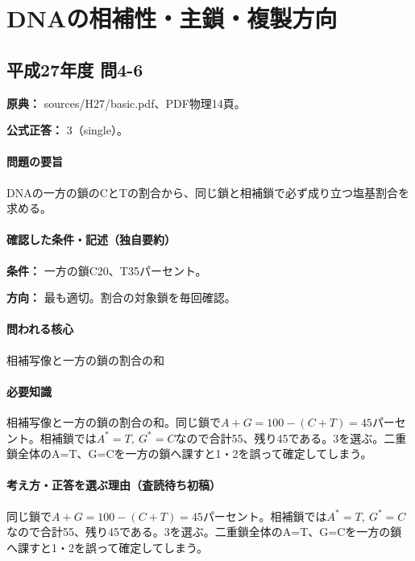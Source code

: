 \section{DNAの相補性・主鎖・複製方向}

\subsection{平成27年度 問4-6}
\label{q:h27-reg-basic-4-6}

\noindent\textbf{原典：} sources/H27/basic.pdf、PDF物理14頁。

\textbf{公式正答：} 3（single）。

\paragraph{問題の要旨} DNAの一方の鎖のCとTの割合から、同じ鎖と相補鎖で必ず成り立つ塩基割合を求める。

\paragraph{確認した条件・記述（独自要約）}\mbox{}\par

\noindent\textbf{条件：} 一方の鎖C20、T35パーセント。\par

\noindent\textbf{方向：} 最も適切。割合の対象鎖を毎回確認。\par

\paragraph{問われる核心} 相補写像と一方の鎖の割合の和

\paragraph{必要知識} 相補写像と一方の鎖の割合の和。同じ鎖で\(A+G=100-(C+T)=45\)パーセント。相補鎖では\(A^{\ast}=T,\ G^{\ast}=C\)なので合計55、残り45である。3を選ぶ。二重鎖全体のA=\allowbreak{}T、G=\allowbreak{}Cを一方の鎖へ課すと1・2を誤って確定してしまう。

\paragraph{考え方・正答を選ぶ理由（査読待ち初稿）} 同じ鎖で\(A+G=100-(C+T)=45\)パーセント。相補鎖では\(A^{\ast}=T,\ G^{\ast}=C\)なので合計55、残り45である。3を選ぶ。二重鎖全体のA=\allowbreak{}T、G=\allowbreak{}Cを一方の鎖へ課すと1・2を誤って確定してしまう。

